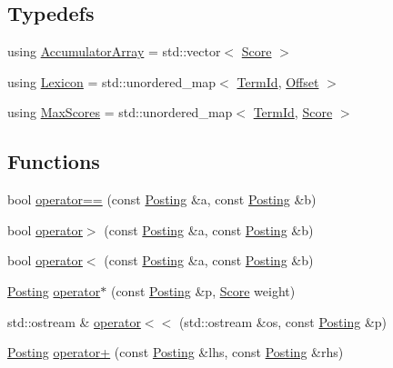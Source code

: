 \subsection*{Typedefs}
\begin{DoxyCompactItemize}
\item 
using \mbox{\hyperlink{namespacebloodhound_ae863daa54e3092bd2bc335e70f7a9dd7}{Accumulator\+Array}} = std\+::vector$<$ \mbox{\hyperlink{structbloodhound_1_1Score}{Score}} $>$
\item 
using \mbox{\hyperlink{namespacebloodhound_a94032a3533df0a1b6d3435bad57e6499}{Lexicon}} = std\+::unordered\+\_\+map$<$ \mbox{\hyperlink{structbloodhound_1_1TermId}{Term\+Id}}, \mbox{\hyperlink{structbloodhound_1_1Offset}{Offset}} $>$
\item 
using \mbox{\hyperlink{namespacebloodhound_a687d80c6f992eba8b820bf30a482f4b4}{Max\+Scores}} = std\+::unordered\+\_\+map$<$ \mbox{\hyperlink{structbloodhound_1_1TermId}{Term\+Id}}, \mbox{\hyperlink{structbloodhound_1_1Score}{Score}} $>$
\end{DoxyCompactItemize}
\subsection*{Functions}
\begin{DoxyCompactItemize}
\item 
bool \mbox{\hyperlink{namespacebloodhound_aa37ad87847e4da8983f626e6c5779c73}{operator==}} (const \mbox{\hyperlink{structbloodhound_1_1Posting}{Posting}} \&a, const \mbox{\hyperlink{structbloodhound_1_1Posting}{Posting}} \&b)
\item 
bool \mbox{\hyperlink{namespacebloodhound_a4a683ebe3ff767a829b87a89bade978c}{operator$>$}} (const \mbox{\hyperlink{structbloodhound_1_1Posting}{Posting}} \&a, const \mbox{\hyperlink{structbloodhound_1_1Posting}{Posting}} \&b)
\item 
bool \mbox{\hyperlink{namespacebloodhound_ae20cf3f97304dde56dd526eaa08c41dc}{operator$<$}} (const \mbox{\hyperlink{structbloodhound_1_1Posting}{Posting}} \&a, const \mbox{\hyperlink{structbloodhound_1_1Posting}{Posting}} \&b)
\item 
\mbox{\hyperlink{structbloodhound_1_1Posting}{Posting}} \mbox{\hyperlink{namespacebloodhound_a0ee8a7512bc2dea6326445fa8b7509b2}{operator$\ast$}} (const \mbox{\hyperlink{structbloodhound_1_1Posting}{Posting}} \&p, \mbox{\hyperlink{structbloodhound_1_1Score}{Score}} weight)
\item 
std\+::ostream \& \mbox{\hyperlink{namespacebloodhound_a1422cc04658f6eb8616381224186059f}{operator$<$$<$}} (std\+::ostream \&os, const \mbox{\hyperlink{structbloodhound_1_1Posting}{Posting}} \&p)
\item 
\mbox{\hyperlink{structbloodhound_1_1Posting}{Posting}} \mbox{\hyperlink{namespacebloodhound_a0b07d73bf298a56b219b270d5fa70b83}{operator+}} (const \mbox{\hyperlink{structbloodhound_1_1Posting}{Posting}} \&lhs, const \mbox{\hyperlink{structbloodhound_1_1Posting}{Posting}} \&rhs)
\end{DoxyCompactItemize}


